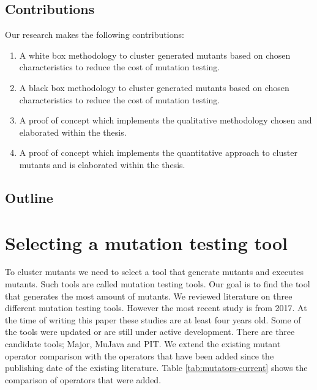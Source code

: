 \documentclass[conference,draftclsnofoot,onecolumn]{IEEEtran}
\begin{document}
\subsection{Contributions}
Our research makes the following contributions:
\begin{enumerate}
 \item A white box methodology to cluster generated mutants based on chosen characteristics to reduce the cost of mutation testing.
  \item A black box methodology to cluster generated mutants based on chosen characteristics to reduce the cost of mutation testing.
 \item A proof of concept which implements the qualitative methodology chosen and elaborated within the thesis.
 \item A proof of concept which implements the quantitative approach to cluster mutants and is elaborated within the thesis. 
\end{enumerate}
\subsection{Outline}

\section{Selecting a mutation testing tool}
To cluster mutants we need to select a tool that generate mutants and executes mutants.
Such tools are called mutation testing tools.
Our goal is to find the tool that generates the most amount of mutants. 
\newline
We reviewed literature on three different mutation testing tools.
However the most recent study is from 2017.
At the time of writing this paper these studies are at least four years old. 
Some of the tools were updated or are still under active development\cite{pit-releases,Major}.
There are three candidate tools; Major, MuJava and PIT.
We extend the existing mutant operator comparison with the operators that have been added since the publishing date of the existing literature.
Table \ref{tab:mutators-current} shows the comparison of operators that were added.
\end{document}
